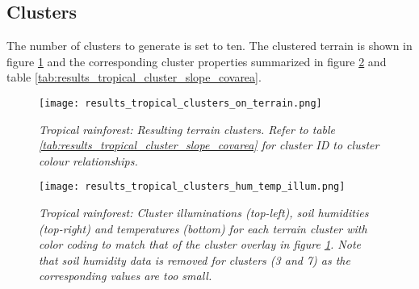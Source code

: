 \subsection{Clusters}

The number of clusters to generate is set to ten. The clustered terrain is shown in figure \ref{fig:results_tropical_terrain_clusters} and the corresponding cluster properties summarized in figure \ref{fig:results_tropical_cluster_hum_temp_illum} and table \ref{tab:results_tropical_cluster_slope_covarea}. 

\begin{figure}
\center
	\texttt{[image: results\_tropical\_clusters\_on\_terrain.png]}
	\caption{ \textit{Tropical rainforest: Resulting terrain clusters. Refer to table \ref{tab:results_tropical_cluster_slope_covarea} for cluster ID to cluster colour relationships.}}
	\label{fig:results_tropical_terrain_clusters}
\end{figure}

\begin{figure}
\center
	\texttt{[image: results\_tropical\_clusters\_hum\_temp\_illum.png]}
	\caption{ \textit{Tropical rainforest: Cluster illuminations (top-left), soil humidities (top-right) and temperatures (bottom) for each terrain cluster with color coding to match that of the cluster overlay in figure \ref{fig:results_tropical_terrain_clusters}. Note that soil humidity data is removed for clusters (3 and 7) as the corresponding values are too small.}}
	\label{fig:results_tropical_cluster_hum_temp_illum}
\end{figure}


